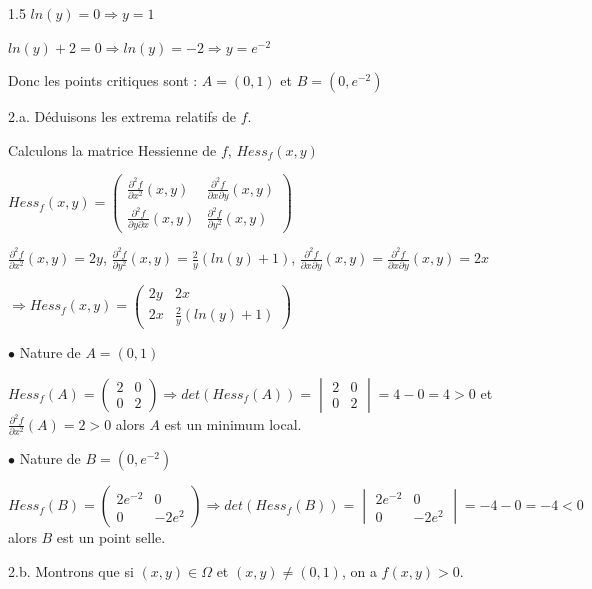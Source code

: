 \documentclass[12pt]{article}
\begin{document}
\begin{spacing}{1.5}
$ln(y)=0\Rightarrow y=1$

$ln(y)+2=0\Rightarrow ln(y)=-2\Rightarrow y=e^{-2}$

Donc les points critiques sont : $A=(0,1)$ et $B=(0,e^{-2})$



2.a. Déduisons les extrema relatifs de $f$.

Calculons la matrice Hessienne de $f$, $Hess_f(x,y)$

$Hess_f(x,y)=\begin{pmatrix}
\frac{\partial^2{f}}{\partial{x^2}}(x,y) & \frac{\partial^2{f}}{\partial{x}\partial{y}}(x,y) \\ 
\frac{\partial^2{f}}{\partial{y}\partial{x}}(x,y) & \frac{\partial^2{f}}{\partial{y^2}}(x,y)
\end{pmatrix}$

$\frac{\partial^2{f}}{\partial{x^2}}(x,y)=2y$, $\frac{\partial^2{f}}{\partial{y^2}}(x,y)=\frac{2}{y}(ln(y)+1)$, $\frac{\partial^2{f}}{\partial{x}\partial{y}}(x,y)=\frac{\partial^2{f}}{\partial{x}\partial{y}}(x,y)=2x$

$\Longrightarrow Hess_f(x,y)=\begin{pmatrix}
2y & 2x \\ 
2x & \frac{2}{y}(ln(y)+1)
\end{pmatrix}$

$\bullet$ Nature de $A=(0,1)$

$Hess_f(A)=\begin{pmatrix}
2 & 0 \\ 
0 & 2
\end{pmatrix} \Longrightarrow det(Hess_f(A))=\begin{vmatrix}
2 & 0 \\ 
0 & 2
\end{vmatrix}=4-0=4>0$ et $\frac{\partial^2{f}}{\partial{x^2}}(A)=2>0$ alors $A$ est un minimum local.

$\bullet$ Nature de $B=(0,e^{-2})$

$Hess_f(B)=\begin{pmatrix}
2e^{-2} & 0 \\ 
0 & -2e^2
\end{pmatrix} \Longrightarrow det(Hess_f(B))=\begin{vmatrix}
2e^{-2} & 0 \\ 
0 & -2e^{2}
\end{vmatrix}=-4-0=-4<0$ alors $B$ est un point selle.


2.b. Montrons que si $(x,y)\in\Omega$ et $(x,y)\neq(0,1)$, on a $f(x,y)>0$.


\end{spacing}
\end{document}

